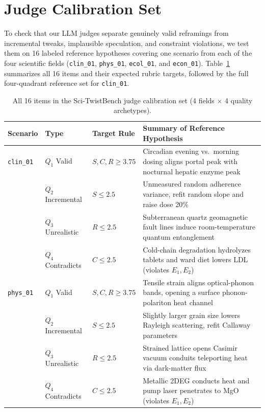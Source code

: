 \documentclass{article}
\begin{document}
\clearpage
\section{Judge Calibration Set}
\label{app:calibration}

To check that our LLM judges separate genuinely valid reframings from incremental tweaks, implausible speculation, and constraint violations, we test them on 16 labeled reference hypotheses covering one scenario from each of the four scientific fields (\texttt{clin\_01}, \texttt{phys\_01}, \texttt{ecol\_01}, and \texttt{econ\_01}). Table~\ref{tab:calibration_items} summarizes all 16 items and their expected rubric targets, followed by the full four-quadrant reference set for \texttt{clin\_01}.

\begin{table}[h]
\centering
\caption{All 16 items in the Sci-TwistBench judge calibration set (4 fields $\times$ 4 quality archetypes).}
\label{tab:calibration_items}
\small
\setlength{\tabcolsep}{4.5pt}
\begin{tabular}{lllp{6.8cm}}
\toprule
Scenario & Type & Target Rule & Summary of Reference Hypothesis \\
\midrule
\texttt{clin\_01} & $Q_1$ Valid & $S,C,R \ge 3.75$ & Circadian evening vs.\ morning dosing aligns portal peak with nocturnal hepatic enzyme peak \\
 & $Q_2$ Incremental & $S \le 2.5$ & Unmeasured random adherence variance, refit random slope and raise dose 20\% \\
 & $Q_3$ Unrealistic & $R \le 2.5$ & Subterranean quartz geomagnetic fault lines induce room-temperature quantum entanglement \\
 & $Q_4$ Contradicts & $C \le 2.5$ & Cold-chain degradation hydrolyzes tablets and ward diet lowers LDL (violates $E_1, E_2$) \\
\midrule
\texttt{phys\_01} & $Q_1$ Valid & $S,C,R \ge 3.75$ & Tensile strain aligns optical-phonon bands, opening a surface phonon-polariton heat channel \\
 & $Q_2$ Incremental & $S \le 2.5$ & Slightly larger grain size lowers Rayleigh scattering, refit Callaway parameters \\
 & $Q_3$ Unrealistic & $R \le 2.5$ & Strained lattice opens Casimir vacuum conduits teleporting heat via dark-matter flux \\
 & $Q_4$ Contradicts & $C \le 2.5$ & Metallic 2DEG conducts heat and pump laser penetrates to MgO (violates $E_1, E_2$) \\

\end{tabular}
\end{table}
\end{document}
